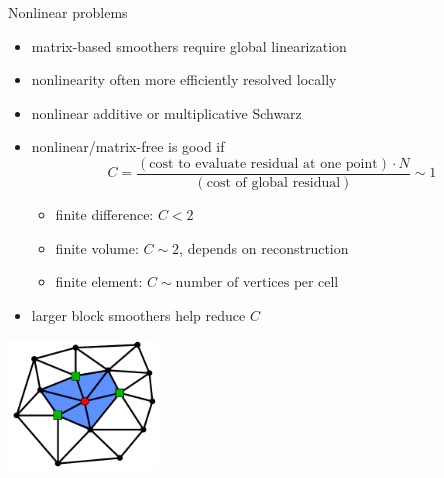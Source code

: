 \begin{frame}{Nonlinear problems}
  \begin{itemize}
  \item matrix-based smoothers require global linearization
  \item nonlinearity often more efficiently resolved locally
  \item nonlinear additive or multiplicative Schwarz
  \item nonlinear/matrix-free is good if
    \[ C = \frac{(\text{cost to evaluate residual at one point}) \cdot N}{(\text{cost of global residual})} \sim 1 \]
    \begin{itemize}
    \item finite difference: $C < 2$
    \item finite volume: $C \sim 2$, depends on reconstruction
    \item finite element: $C \sim \text{number of vertices per cell}$
    \end{itemize}
  \item larger block smoothers help reduce $C$
  \end{itemize}
  \vspace{-2.5em}
  \hfill \includegraphics[width=0.3\textwidth]{figures/NodeStencil}
\end{frame}
